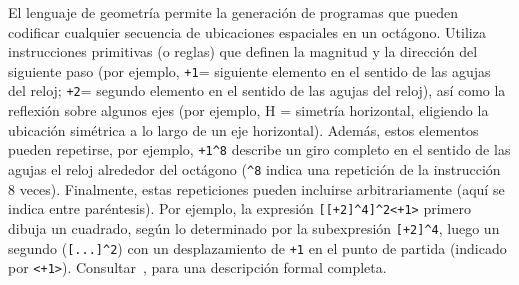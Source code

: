 
\color{red}

El lenguaje de geometría permite la generación de programas que pueden codificar cualquier secuencia de ubicaciones espaciales en un octágono. Utiliza instrucciones primitivas (o reglas) que definen la magnitud y la dirección del siguiente paso (por ejemplo, \verb#+1#= siguiente elemento en el sentido de las agujas del reloj; \verb#+2#= segundo elemento en el sentido de las agujas del reloj), así como la reflexión sobre algunos ejes (por ejemplo, H = simetría horizontal, eligiendo la ubicación simétrica a lo largo de un eje horizontal). Además, estos elementos pueden repetirse, por ejemplo, \verb#+1^8# describe un giro completo en el sentido de las agujas el reloj alrededor del octágono (\verb#^8# indica una repetición de la instrucción 8 veces). Finalmente, estas repeticiones pueden incluirse arbitrariamente (aquí se indica entre paréntesis). Por ejemplo, la expresión \verb#[[+2]^4]^2<+1># primero dibuja un cuadrado, según lo determinado por la subexpresión \verb#[+2]^4#, luego un segundo (\verb#[...]^2#) con un desplazamiento de \verb#+1# en el punto de partida (indicado por \verb#<+1>#). Consultar~\cite{amalric2017language}, para una descripción formal completa. 

